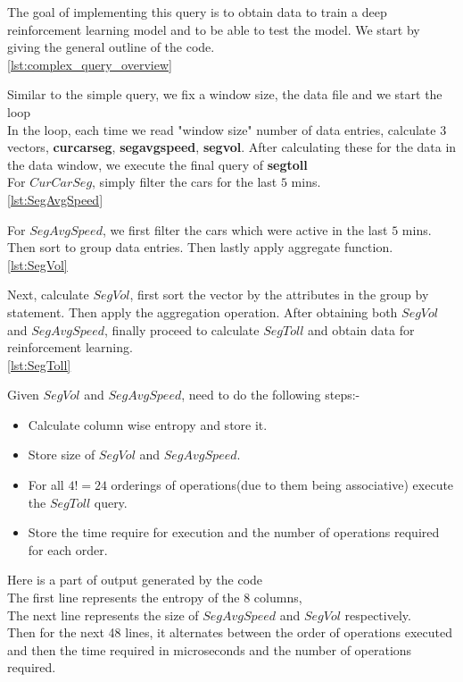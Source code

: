 The goal of implementing this query is to obtain data to train a deep reinforcement learning model and to be able to test the model. We start by giving the general outline of the code. \\
\ref{lst:complex_query_overview}
\par Similar to the simple query, we fix a window size, the data file and we start the loop\\
In the loop, each time we read "window size" number of data entries, calculate $3$ vectors, \textbf{curcarseg}, \textbf{segavgspeed}, \textbf{segvol}. After calculating these for the data in the data window, we execute the final query of \textbf{segtoll}\\
For $CurCarSeg$, simply filter the cars for the last $5$ mins.\\
\ref{lst:SegAvgSpeed}
\par For $SegAvgSpeed$, we first filter the cars which were active in the last $5$ mins.\\
Then sort to group data entries. Then lastly apply aggregate function.\\ 
\ref{lst:SegVol}
\par Next, calculate $SegVol$, first sort the vector by the attributes in the group by statement. Then apply the aggregation operation.
After obtaining both $SegVol$ and $SegAvgSpeed$, finally proceed to calculate $SegToll$ and obtain data for reinforcement learning.\\
\ref{lst:SegToll}
\par Given $SegVol$ and $SegAvgSpeed$,  need to do the following steps:-
\begin{itemize}
    \item Calculate column wise entropy and store it.
    \item Store size of $SegVol$ and $SegAvgSpeed$.
    \item For all $4!=24$ orderings of operations(due to them being associative) execute the $SegToll$ query.
    \item Store the time require for execution and the number of operations required for each order.
\end{itemize}
Here is a part of output generated by the code\\
The first line represents the entropy of the $8$ columns,\\
The next line represents the size of $SegAvgSpeed$ and $SegVol$ respectively.\\
Then for the next 48 lines, it alternates between the order of operations executed and then the time required in microseconds and the number of operations required.\\
